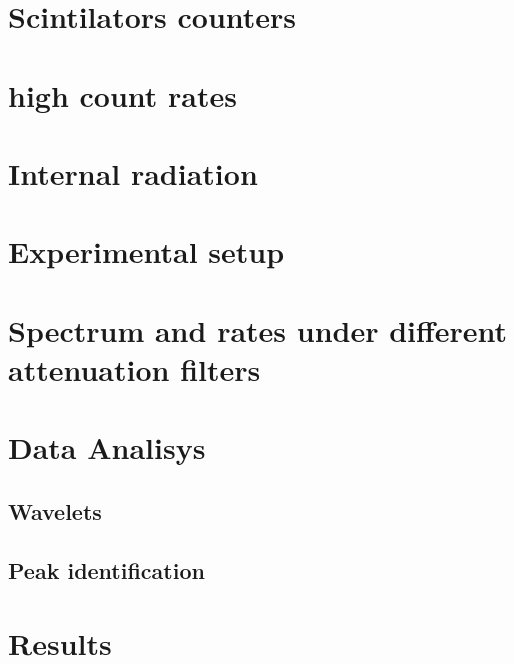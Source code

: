 \section{Scintilators counters}

\section{high count rates}

\section{Internal radiation}

\section{Experimental setup}

\section{Spectrum and rates under different attenuation filters}

\section{Data Analisys}
\subsection{Wavelets}
\subsection{Peak identification}
\section{Results}

